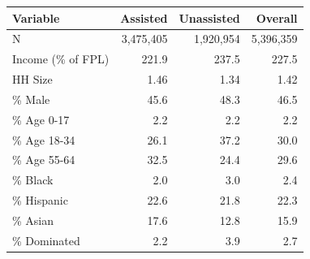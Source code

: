 \begin{tabular}{lrrr}
\hline\hline
Variable & Assisted & Unassisted & Overall \\
\hline
N & 3,475,405 & 1,920,954 & 5,396,359 \\
Income (\% of FPL) & 221.9 & 237.5 & 227.5 \\
HH Size & 1.46 & 1.34 & 1.42 \\
\% Male & 45.6 & 48.3 & 46.5 \\
\% Age 0-17 & 2.2 & 2.2 & 2.2 \\
\% Age 18-34 & 26.1 & 37.2 & 30.0 \\
\% Age 55-64 & 32.5 & 24.4 & 29.6 \\
\% Black & 2.0 & 3.0 & 2.4 \\
\% Hispanic & 22.6 & 21.8 & 22.3 \\
\% Asian & 17.6 & 12.8 & 15.9 \\
\% Dominated & 2.2 & 3.9 & 2.7 \\
\hline\hline
\end{tabular}
